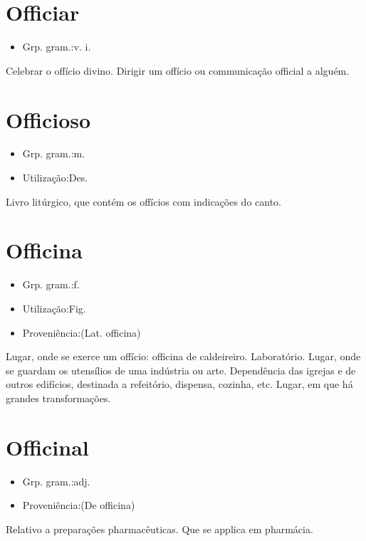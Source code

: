 \section{Officiar}
\begin{itemize}
\item {Grp. gram.:v. i.}
\end{itemize}
Celebrar o offício divino.
Dirigir um offício ou communicação official a alguém.
\section{Officioso}
\begin{itemize}
\item {Grp. gram.:m.}
\end{itemize}
\begin{itemize}
\item {Utilização:Des.}
\end{itemize}
Livro litúrgico, que contém os offícios com indicações do canto.
\section{Officina}
\begin{itemize}
\item {Grp. gram.:f.}
\end{itemize}
\begin{itemize}
\item {Utilização:Fig.}
\end{itemize}
\begin{itemize}
\item {Proveniência:(Lat. \textunderscore officina\textunderscore )}
\end{itemize}
Lugar, onde se exerce um offício: \textunderscore officina de caldeireiro\textunderscore .
Laboratório.
Lugar, onde se guardam os utensílios de uma indústria ou arte.
Dependência das igrejas e de outros edifícios, destinada a refeitório, dispensa, cozinha, etc.
Lugar, em que há grandes transformações.
\section{Officinal}
\begin{itemize}
\item {Grp. gram.:adj.}
\end{itemize}
\begin{itemize}
\item {Proveniência:(De \textunderscore officina\textunderscore )}
\end{itemize}
Relativo a preparações pharmacêuticas.
Que se applica em pharmácia.
